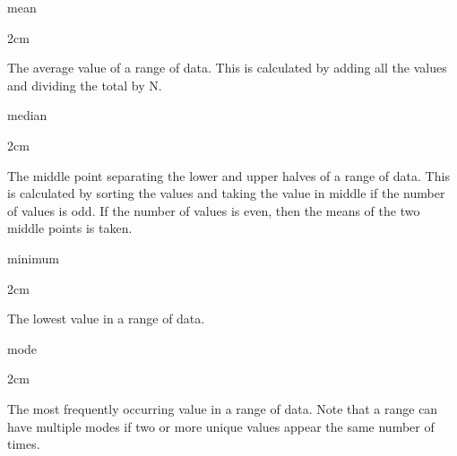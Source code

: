 \documentclass[
]{book}
\newenvironment{glsentry}
  {
  \begin{minipage}{\textwidth}
  }
  {
  \end{minipage}
  }
\newenvironment{glsterm}
  {
  \bfseries
  }
  {
  }
\newenvironment{glsdef}
  {
  \noindent
  \flushleft
  \begin{adjustwidth}{2cm}{}
  }
  {
  \end{adjustwidth}
  }
\theoremstyle{definition}
\theoremstyle{definition}
\theoremstyle{definition}
\theoremstyle{definition}
\theoremstyle{remark}
\begin{document}
\begin{glsentry}

\begin{glsterm}
mean

\end{glsterm}

\begin{glsdef}
The average value of a range of data. This is calculated by adding all the values and dividing the total by N.

\end{glsdef}

\end{glsentry}

\begin{glsentry}

\begin{glsterm}
median

\end{glsterm}

\begin{glsdef}
The middle point separating the lower and upper halves of a range of data. This is calculated by sorting the values and taking the value in middle if the number of values is odd. If the number of values is even, then the means of the two middle points is taken.

\end{glsdef}

\end{glsentry}

\begin{glsentry}

\begin{glsterm}
minimum

\end{glsterm}

\begin{glsdef}
The lowest value in a range of data.

\end{glsdef}

\end{glsentry}

\begin{glsentry}

\begin{glsterm}
mode

\end{glsterm}

\begin{glsdef}
The most frequently occurring value in a range of data. Note that a range can have multiple modes if two or more unique values appear the same number of times.

\end{glsdef}

\end{glsentry}
\end{document}
